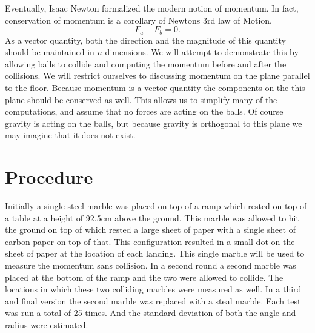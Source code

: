 \documentclass[11pt]{article}
\begin{document}
Eventually, Isaac Newton formalized the modern notion of momentum. In fact, conservation of momentum is a corollary of Newtons 3rd law of Motion,
\begin{equation}
F_a - F_b = 0.
\end{equation}
As a vector quantity, both the direction and the magnitude of this quantity should be maintained in \(n\) dimensions. We will attempt to demonstrate this by allowing balls to collide and computing the momentum before and after the collisions. We will restrict ourselves to discussing momentum on the plane parallel to the floor. Because momentum is a vector quantity the components on the this plane should be conserved as well. This allows us to simplify many of the computations, and assume that no forces are acting on the balls. Of course gravity is acting on the balls, but because gravity is orthogonal to this plane we may imagine that it does not exist.  	
\section{Procedure}
Initially a single steel marble was placed on top of a ramp which rested on top of a table at a height of 92.5cm above the ground. This marble was allowed to hit the ground on top of which rested a large sheet of paper with a single sheet of carbon paper on top of that. This configuration resulted in a small dot on the sheet of paper at the location of each landing. This single marble will be used to measure the momentum sans collision. In a second round a second marble was placed at the bottom of the ramp and the two were allowed to collide. The locations in which these two colliding marbles were measured as well. In a third and final version the second marble was replaced with a steal marble. Each test was run a total of 25 times. And the standard deviation of both the angle and radius were estimated.
\end{document}
